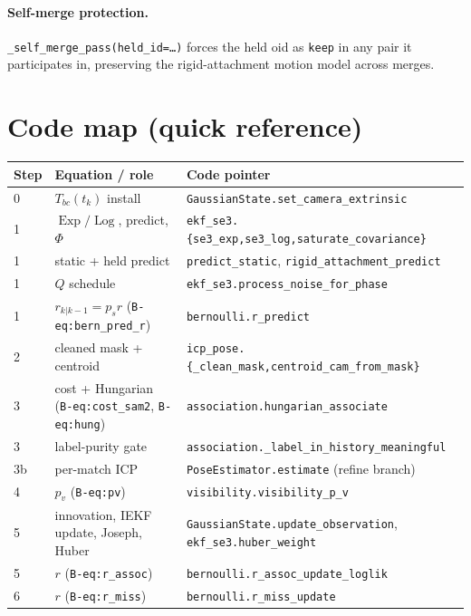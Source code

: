 \documentclass[11pt]{article}
\DeclareMathOperator{\Exp}{Exp}
\DeclareMathOperator{\Log}{Log}
\newcommand{\code}[1]{\texttt{\small #1}}
\begin{document}
\paragraph{Self-merge protection.}
\code{\_self\_merge\_pass(held\_id=\dots)} forces the held oid as
\code{keep} in any pair it participates in, preserving the
rigid-attachment motion model across merges.

\section{Code map (quick reference)}

\begin{center}
\small
\begin{tabular}{lll}
\hline
Step & Equation / role & Code pointer \\\hline
0    & $T_{bc}(t_k)$ install & \code{GaussianState.set\_camera\_extrinsic} \\
1    & $\Exp/\Log$, predict, $\Phi$ & \code{ekf\_se3.\{se3\_exp,se3\_log,saturate\_covariance\}} \\
1    & static + held predict & \code{predict\_static}, \code{rigid\_attachment\_predict} \\
1    & $Q$ schedule & \code{ekf\_se3.process\_noise\_for\_phase} \\
1    & $r_{k|k-1}=p_s r$ (\code{B-eq:bern\_pred\_r}) & \code{bernoulli.r\_predict} \\
2    & cleaned mask + centroid & \code{icp\_pose.\{\_clean\_mask,centroid\_cam\_from\_mask\}} \\
3    & cost + Hungarian (\code{B-eq:cost\_sam2}, \code{B-eq:hung}) & \code{association.hungarian\_associate} \\
3    & label-purity gate & \code{association.\_label\_in\_history\_meaningful} \\
3b   & per-match ICP & \code{PoseEstimator.estimate} (refine branch) \\
4    & $p_v$ (\code{B-eq:pv}) & \code{visibility.visibility\_p\_v} \\
5    & innovation, IEKF update, Joseph, Huber & \code{GaussianState.update\_observation}, \code{ekf\_se3.huber\_weight} \\
5    & $r$ (\code{B-eq:r\_assoc}) & \code{bernoulli.r\_assoc\_update\_loglik} \\
6    & $r$ (\code{B-eq:r\_miss}) & \code{bernoulli.r\_miss\_update} \\

\end{tabular}
\end{center}
\end{document}
